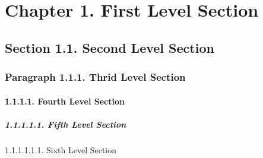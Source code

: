 \hypertarget{first-level-section}{%
\section{Chapter 1. First Level Section}\label{first-level-section}}

\hypertarget{second-level-section}{%
\subsection{Section 1.1. Second Level
Section}\label{second-level-section}}

\hypertarget{thrid-level-section}{%
\subsubsection{Paragraph 1.1.1. Thrid Level
Section}\label{thrid-level-section}}

\hypertarget{fourth-level-section}{%
\paragraph{1.1.1.1. Fourth Level Section}\label{fourth-level-section}}

\hypertarget{fifth-level-section}{%
\subparagraph{1.1.1.1.1. Fifth Level
Section}\label{fifth-level-section}}

1.1.1.1.1.1. Sixth Level Section
